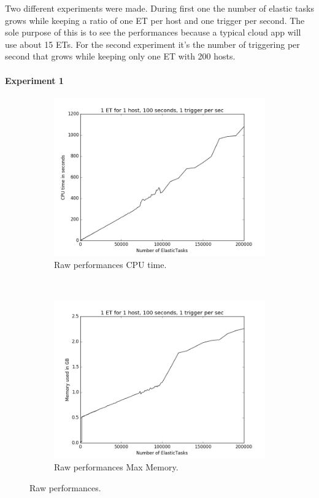 \documentclass[a4paper, onecolumn, 11pt]{article}
\begin{document}
  	Two different experiments were made. During first one the number of elastic 
  	tasks grows while keeping a ratio of one ET per host and one trigger per 
  	second. The sole purpose of this is to see the performances because a 
  	typical cloud app will use about 15 ETs. For the second experiment it's the 
  	number of triggering per second that grows while keeping only one ET with 
  	200 hosts.
    
    \paragraph{Experiment 1}
    \begin{figure}
    	\centering
    	\hspace*{-4em}
    	\begin{subfigure}[t]{0.6\textwidth}
    		\includegraphics[width=\textwidth]{../plots/raw_perf_time}
    		\caption{Raw performances CPU time.}
    		\label{time_raw}
    	\end{subfigure}%
    	~
    	\begin{subfigure}[t]{0.6\textwidth}
    		\includegraphics[width=\textwidth]{../plots/raw_perf_mem}
    		\caption{Raw performances Max Memory.}
    		\label{mem_raw}
    	\end{subfigure}%
    	\caption{Raw performances.}
    \end{figure}
    
\end{document}
